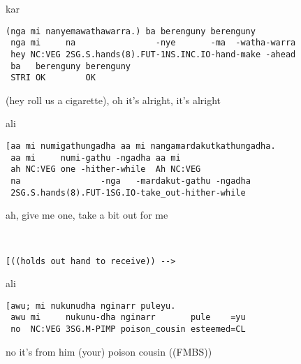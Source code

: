 \documentclass[output=paper,nonflat,colorlinks,citecolor=brown]{langsci/langscibook}
\begin{document}
\vspace{2mm}
%
\begin{transbox}{1}{kar}
\begin{verbatim}
(nga mi nanyemawathawarra.) ba berenguny berenguny
 nga mi     na                -nye       -ma  -watha-warra
 hey NC:VEG 2SG.S.hands(8).FUT-1NS.INC.IO-hand-make -ahead
 ba   berenguny berenguny
 STRI OK        OK
\end{verbatim}
\hspace{0.07cm} (hey roll us a cigarette), oh it's alright, it's alright
\end{transbox}
%
\begin{mdframednoverticalspace}[style=firstfoc]
\begin{transbox}{2}{ali}
\begin{verbatim}
[aa mi numigathungadha aa mi nangamardakutkathungadha.
 aa mi     numi-gathu -ngadha aa mi
 ah NC:VEG one -hither-while  Ah NC:VEG
 na                -nga   -mardakut-gathu -ngadha
 2SG.S.hands(8).FUT-1SG.IO-take_out-hither-while
\end{verbatim}
\hspace{0.07cm} ah, give me one, take a bit out for me
\end{transbox}
\end{mdframednoverticalspace}
\begin{mdframednoverticalspace}[style=firstfoc]
\begin{transbox}{3}{~}
\begin{verbatim}
[((holds out hand to receive)) -->
\end{verbatim}
\end{transbox}
\end{mdframednoverticalspace}
%
%
\begin{mdframednoverticalspace}[style=secondfoc]
\begin{transbox}{5}{ali}
\begin{verbatim}
[awu; mi nukunudha nginarr puleyu.
 awu mi     nukunu-dha nginarr       pule    =yu
 no  NC:VEG 3SG.M-PIMP poison_cousin esteemed=CL
\end{verbatim}
\hspace{0.07cm} no it's from him (your) poison cousin ((FMBS))
\end{transbox}
\end{mdframednoverticalspace}
\emptytransbox{6}{[(Karen gets out tobacco, Alice holds out hand, Figure 8))}
\end{document}
